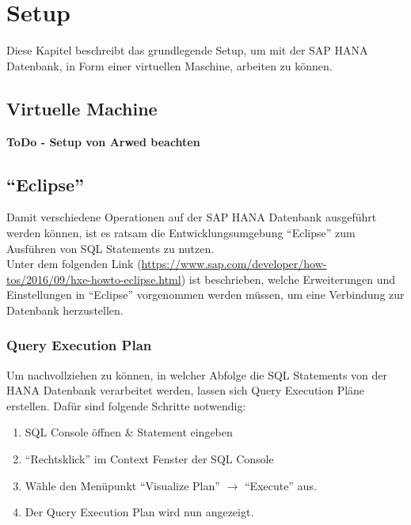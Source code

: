 \chapter{Setup}
Diese Kapitel beschreibt das grundlegende Setup, um mit der SAP HANA Datenbank, in Form einer virtuellen Maschine, arbeiten zu können.

\section{Virtuelle Machine}
\textbf{ToDo - Setup von Arwed beachten}

\section{\enquote{Eclipse}}
Damit verschiedene Operationen auf der SAP HANA Datenbank ausgeführt werden können, ist es ratsam die Entwicklungsumgebung \enquote{Eclipse} zum Ausführen von SQL Statements zu nutzen. \\Unter dem folgenden Link (\url{https://www.sap.com/developer/how-tos/2016/09/hxe-howto-eclipse.html}) ist beschrieben, welche Erweiterungen und Einstellungen in \enquote{Eclipse} vorgenommen werden müssen, um eine Verbindung zur Datenbank herzustellen.

\subsection{Query Execution Plan}
Um nachvollziehen zu können, in welcher Abfolge die SQL Statements von der HANA Datenbank verarbeitet werden, lassen sich Query Execution Pläne erstellen.
Dafür sind folgende Schritte notwendig:
\begin{enumerate}
	\item SQL Console öffnen \& Statement eingeben
	\item \enquote{Rechtsklick} im Context Fenster der SQL Console
	\item Wähle den Menüpunkt \enquote{Visualize Plan} $\rightarrow$ \enquote{Execute} aus.
	\item Der Query Execution Plan wird nun angezeigt.
\end{enumerate} 
